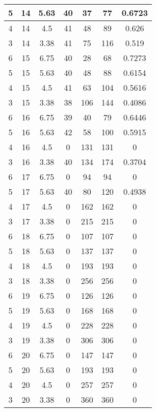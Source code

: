 \documentclass[letterpaper, 12pt]{article}
\begin{document}
\begin{longtable}{|c|c|c|c|c|c|c|}
\hline
5 & 14 & 5.63 & 40 & 37 & 77 & 0.6723 \\
\hline
4 & 14 & 4.5 & 41 & 48 & 89 & 0.626 \\
\hline
3 & 14 & 3.38 & 41 & 75 & 116 & 0.519 \\
\hline
6 & 15 & 6.75 & 40 & 28 & 68 & 0.7273 \\
\hline
5 & 15 & 5.63 & 40 & 48 & 88 & 0.6154 \\
\hline
4 & 15 & 4.5 & 41 & 63 & 104 & 0.5616 \\
\hline
3 & 15 & 3.38 & 38 & 106 & 144 & 0.4086 \\
\hline
6 & 16 & 6.75 & 39 & 40 & 79 & 0.6446 \\
\hline
5 & 16 & 5.63 & 42 & 58 & 100 & 0.5915 \\
\hline
4 & 16 & 4.5 & 0 & 131 & 131 & 0 \\
\hline
3 & 16 & 3.38 & 40 & 134 & 174 & 0.3704 \\
\hline
6 & 17 & 6.75 & 0 & 94 & 94 & 0 \\
\hline
5 & 17 & 5.63 & 40 & 80 & 120 & 0.4938 \\
\hline
4 & 17 & 4.5 & 0 & 162 & 162 & 0 \\
\hline
3 & 17 & 3.38 & 0 & 215 & 215 & 0 \\
\hline
6 & 18 & 6.75 & 0 & 107 & 107 & 0 \\
\hline
5 & 18 & 5.63 & 0 & 137 & 137 & 0 \\
\hline
4 & 18 & 4.5 & 0 & 193 & 193 & 0 \\
\hline
3 & 18 & 3.38 & 0 & 256 & 256 & 0 \\
\hline
6 & 19 & 6.75 & 0 & 126 & 126 & 0 \\
\hline
5 & 19 & 5.63 & 0 & 168 & 168 & 0 \\
\hline
4 & 19 & 4.5 & 0 & 228 & 228 & 0 \\
\hline
3 & 19 & 3.38 & 0 & 306 & 306 & 0 \\
\hline
6 & 20 & 6.75 & 0 & 147 & 147 & 0 \\
\hline
5 & 20 & 5.63 & 0 & 193 & 193 & 0 \\
\hline
4 & 20 & 4.5 & 0 & 257 & 257 & 0 \\
\hline
3 & 20 & 3.38 & 0 & 360 & 360 & 0 \\
\hline
\end{longtable}
\end{document}

